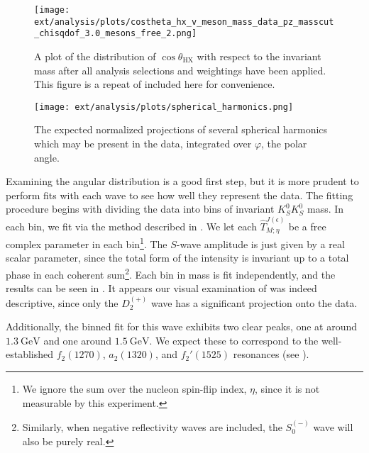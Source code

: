 \begin{figure}
  \begin{center}
    \texttt{[image: ext/analysis/plots/costheta\_hx\_v\_meson\_mass\_data\_pz\_masscut\_chisqdof\_3.0\_mesons\_free\_2.png]}
  \end{center}
  \caption{A plot of the distribution of $\cos\theta_\text{HX}$ with respect to the invariant mass after all analysis selections and weightings have been applied. This figure is a repeat of  included here for convenience.}\label{fig:costheta-vs-mass}
\end{figure}

\begin{figure}
  \begin{center}
    \texttt{[image: ext/analysis/plots/spherical\_harmonics.png]}
  \end{center}
  \caption{The expected normalized projections of several spherical harmonics which may be present in the data, integrated over $\varphi$, the polar angle.}\label{fig:spherical-harmonics}
\end{figure}

Examining the angular distribution is a good first step, but it is more prudent to perform fits with each wave to see how well they represent the data. The fitting procedure begins with dividing the data into bins of invariant $K_S^0K_S^0$ mass. In each bin, we fit  via the method described in . We let each $\hat{T}_{M;\eta}^{J(\epsilon)}$ be a free complex parameter in each bin\footnote{We ignore the sum over the nucleon spin-flip index, $\eta$, since it is not measurable by this experiment.}. The $S$-wave amplitude is just given by a real scalar parameter, since the total form of the intensity is invariant up to a total phase in each coherent sum\footnote{Similarly, when negative reflectivity waves are included, the $S_0^{(-)}$ wave will also be purely real.}. Each bin in mass is fit independently, and the results can be seen in . It appears our visual examination of  was indeed descriptive, since only the $D_2^{(+)}$ wave has a significant projection onto the data.

Additionally, the binned fit for this wave exhibits two clear peaks, one at around $\SI{1.3}{\giga\electronvolt}$ and one around $\SI{1.5}{\giga\electronvolt}$. We expect these to correspond to the well-established $f_2(1270)$, $a_2(1320)$, and $f_2'(1525)$ resonances (see ). 


